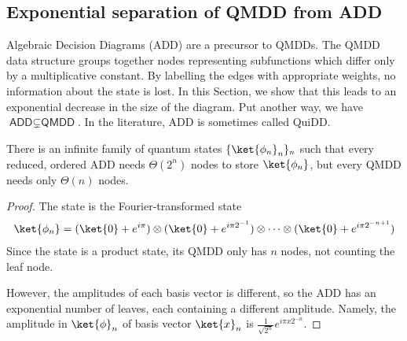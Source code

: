 \subsection{Exponential separation of QMDD from ADD}

Algebraic Decision Diagrams (\textsf{ADD}) are a precursor to \textsf{QMDD}s.
The \textsf{QMDD} data structure groups together nodes representing subfunctions which differ only by a multiplicative constant.
By labelling the edges with appropriate weights, no information about the state is lost.
In this Section, we show that this leads to an exponential decrease in the size of the diagram.
Put another way, we have $\textsf{ADD}\subsetneq \textsf{QMDD}$.
In the literature, \textsf{ADD} is sometimes called \textsf{QuiDD}.

\begin{theorem}
	There is an infinite family of quantum states $\{\ket{\phi_n}_n\}_{n}$ such that every reduced, ordered \textsf{ADD} needs $\Theta(2^n)$ nodes to store $\ket{\phi_n}$, but every \textsf{QMDD} needs only $\Theta(n)$ nodes.
\end{theorem}
\begin{proof}
	The state is the Fourier-transformed state
	\begin{align}
		\ket{\phi_n}=(\ket{0}+e^{i\pi})\otimes (\ket{0}+e^{i\pi2^{-1}})\otimes \cdots \otimes (\ket{0}+e^{i\pi2^{-n+1}})
	\end{align}
	Since the state is a product state, its QMDD only has $n$ nodes, not counting the \textsf{leaf} node.
	
	However, the amplitudes of each basis vector is different, so the \textsf{ADD} has an exponential number of leaves, each containing a different amplitude. Namely, the amplitude in $\ket{\phi}_n$ of basis vector $\ket{x}_n$ is $\frac{1}{\sqrt{2^n}}e^{i\pi x2^{-n}}$.
\end{proof}